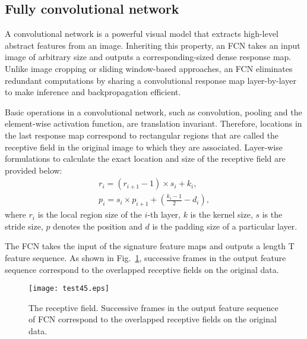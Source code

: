 \documentclass[10pt,conference,a4paper]{IEEEtran}
\begin{document}
\subsection{Fully convolutional network}
A convolutional network is a powerful visual model that extracts high-level abstract features from an image.
Inheriting this property, an FCN\cite{long2015fully} takes an input image of arbitrary size and outputs a corresponding-sized dense response map.
Unlike image cropping or sliding window-based approaches, an FCN eliminates redundant computations by sharing a convolutional response map layer-by-layer to make inference and backpropagation efficient.


Basic operations in a convolutional network, such as convolution, pooling and the element-wise activation function, are translation invariant.
Therefore, locations in the last response map correspond to rectangular regions that are called the receptive field in the original image to which they are associated.
Layer-wise formulations to calculate the exact location and size of the receptive field are provided below:
\begin{gather}
    r_i=(r_{i+1}-1)\times s_i+k_i,\\
    p_i=s_i \times p_{i+1}+(\frac{k_i-1}{2}-d_i),
\end{gather}
where $r_i$ is the local region size of the $i$-th layer, $k$ is the kernel size, $s$ is the stride size, $p$ denotes the position and $d$ is the padding size of a particular layer.


The FCN takes the input of the signature feature maps and outputs a length T feature sequence. As shown in Fig.~\ref{FigureTheReceptiveField}, successive frames in the output feature sequence correspond to the overlapped receptive fields on the original data.


\begin{figure}[t]
\centering
\texttt{[image: test45.eps]}
\caption{The receptive field. Successive frames in the output feature
sequence of FCN correspond to the overlapped receptive fields on the
original data.}
\label{FigureTheReceptiveField}
\end{figure}
\end{document}
